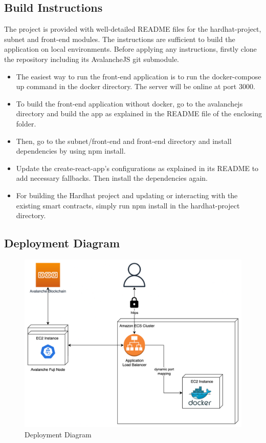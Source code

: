 \documentclass[a4paper,12pt]{report}
\begin{document}
\subsection{Build Instructions}
The project is provided with well-detailed README files for the hardhat-project, subnet and front-end modules. The instructions are sufficient to build the application on local environments. Before applying any instructions, firstly clone the repository including its AvalancheJS git submodule.
\begin{itemize}
	\item 
	The easiest way to run the front-end application is to run the docker-compose up command in the docker directory. The server will be online at port 3000.
	\item 
	To build the front-end application without docker, go to the avalanchejs directory and build the app as explained in the README file of the enclosing folder. 
	\item 
	Then, go to the subnet/front-end and front-end directory and install dependencies by using npm install. 
	\item 
	Update the create-react-app’s configurations as explained in its README to add necessary fallbacks. Then install the dependencies again.
	\item 
	For building the Hardhat project and updating or interacting with the existing smart contracts, simply run npm install in the hardhat-project directory.
\end{itemize}
\newpage
\subsection{Deployment Diagram}
\begin{figure}[H]
	\centering
	\includegraphics[width=1\textwidth]{deployment.png}
	\caption{Deployment Diagram}
\end{figure}
\end{document}
